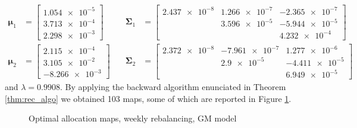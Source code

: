 \begin{align}
\label{eq:GMparam1}
\bm{\mu}_1 & = 
\begin{bmatrix}
\num{1.054e-5} \\
\num{3.713e-4} \\
\num{2.298e-3}
\end{bmatrix}
\quad & \bm{\Sigma}_1 &= 
\begin{bmatrix}
\num{2.437e-8} & \num{1.266e-7} & \num{-2.365e-7} \\
& \num{3.596e-5}  & \num{-5.944e-5} \\
&                & \num{4.232e-4}
\end{bmatrix} \\
\bm{\mu}_2 & = \begin{bmatrix}
\num{2.115e-4} \\
\num{3.105e-2} \\
\num{-8.266e-3}
\end{bmatrix}
\quad & \bm{\Sigma}_2 &= 
\begin{bmatrix}
\num{2.372e-8} & \num{-7.961e-7} & \num{1.277e-6} \\
& \num{2.9e-5}  & \num{-4.411e-5} \\
&                & \num{6.949e-5}
\end{bmatrix}
\label{eq:GMparam2}
\end{align}
and $\lambda = 0.9908$.
By applying the backward algorithm enunciated in Theorem \ref{thm:rec_algo} we obtained 103 maps, some of which are reported in Figure \ref{fig:mapsMixture}.
\begin{figure}[]
	\caption{Optimal allocation maps, weekly rebalancing, GM model}
	\label{fig:mapsMixture}
\end{figure}


